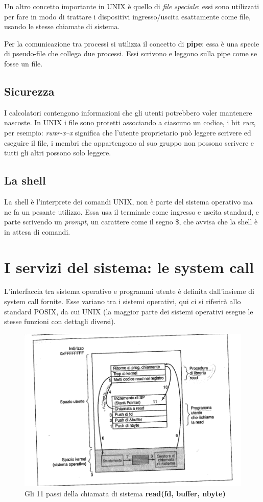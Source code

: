 Un altro concetto importante in UNIX è quello di \textit{file speciale}: essi sono utilizzati per fare in modo di trattare i dispositivi ingresso/uscita esattamente come file, usando le stesse chiamate di sistema.

Per la comunicazione tra processi si utilizza il concetto di \textbf{pipe}: essa è una specie di pseudo-file che collega due processi. Essi scrivono e leggono sulla pipe come se fosse un file.

\subsection{Sicurezza}

I calcolatori contengono informazioni che gli utenti potrebbero voler mantenere nascoste. In UNIX i file sono protetti associando a ciascuno un codice, i bit \textit{rwx}, per esempio: \textit{rwxr-x--x} significa che l'utente proprietario può leggere scrivere ed eseguire il file, i membri che appartengono al suo gruppo non possono scrivere e tutti gli altri possono solo leggere.

\subsection{La shell}

La shell è l'interprete dei comandi UNIX, non è parte del sistema operativo ma ne fa un pesante utilizzo. Essa usa il terminale come ingresso e uscita standard, e parte scrivendo un \textit{prompt}, un carattere come il segno \$, che avvisa che la shell è in attesa di comandi.

\section{I servizi del sistema: le system call}

L'interfaccia tra sistema operativo e programmi utente è definita dall'insieme di system call fornite. Esse variano tra i sistemi operativi, qui ci si riferirà allo standard POSIX, da cui UNIX (la maggior parte dei sistemi operativi esegue le stesse funzioni con dettagli diversi).

\begin{figure}
\includegraphics[width=0.85\linewidth]{assets/read2.png} 
\caption{Gli 11 passi della chiamata di sistema \textbf{read(fd, buffer, nbyte)}}
\end{figure}

